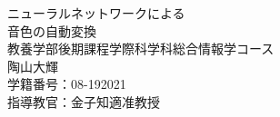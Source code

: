\begin{titlepage}
\begin{center}
\vspace*{160truept}
{\huge ニューラルネットワークによる}\\
\vspace{10truept}
{\huge 音色の自動変換}\\
\vspace{200truept}
{\Large 教養学部後期課程学際科学科総合情報学コース}\\
\vspace{10truept}
{\Large 陶山大輝}\\
\vspace{10truept}
{\Large 学籍番号：08-192021}\\
\vspace{10truept}
{\Large 指導教官：金子知適准教授}\\  
\end{center}
\end{titlepage}